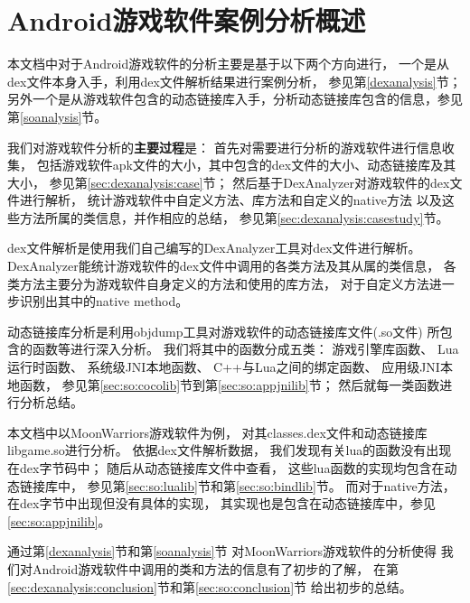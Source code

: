 \section{Android游戏软件案例分析概述}
本文档中对于Android游戏软件的分析主要是基于以下两个方向进行，
一个是从dex文件本身入手，利用dex文件解析结果进行案例分析，
参见第\ref{dexanalysis}节；
另外一个是从游戏软件包含的动态链接库入手，分析动态链接库包含的信息，参见第\ref{soanalysis}节。

我们对游戏软件分析的\textbf{主要过程}是：
首先对需要进行分析的游戏软件进行信息收集，
包括游戏软件apk文件的大小，其中包含的dex文件的大小、动态链接库及其大小，
参见第\ref{sec:dexanalysis:case}节；
然后基于DexAnalyzer对游戏软件的dex文件进行解析，
统计游戏软件中自定义方法、库方法和自定义的native方法
以及这些方法所属的类信息，并作相应的总结，
参见第\ref{sec:dexanalysis:casestudy}节。

dex文件解析是使用我们自己编写的DexAnalyzer工具对dex文件进行解析。
DexAnalyzer能统计游戏软件的dex文件中调用的各类方法及其从属的类信息，
各类方法主要分为游戏软件自身定义的方法和使用的库方法，
对于自定义方法进一步识别出其中的native method。

动态链接库分析是利用objdump工具对游戏软件的动态链接库文件(.so文件)
所包含的函数等进行深入分析。
我们将其中的函数分成五类：
游戏引擎库函数、
Lua运行时函数、
系统级JNI本地函数、
C++与Lua之间的绑定函数、
应用级JNI本地函数，
参见第\ref{sec:so:cocolib}节到第\ref{sec:so:appjnilib}节；
然后就每一类函数进行分析总结。

本文档中以MoonWarriors游戏软件为例，
对其classes.dex文件和动态链接库libgame.so进行分析。
依据dex文件解析数据，
我们发现有关lua的函数没有出现在dex字节码中；
随后从动态链接库文件中查看，
这些lua函数的实现均包含在动态链接库中，
参见第\ref{sec:so:lualib}节和第\ref{sec:so:bindlib}节。
而对于native方法，在dex字节中出现但没有具体的实现，
其实现也是包含在动态链接库中，参见\ref{sec:so:appjnilib}。

通过第\ref{dexanalysis}节和第\ref{soanalysis}节
对MoonWarriors游戏软件的分析使得
我们对Android游戏软件中调用的类和方法的信息有了初步的了解，
在第\ref{sec:dexanalysis:conclusion}节和第\ref{sec:so:conclusion}节
给出初步的总结。


